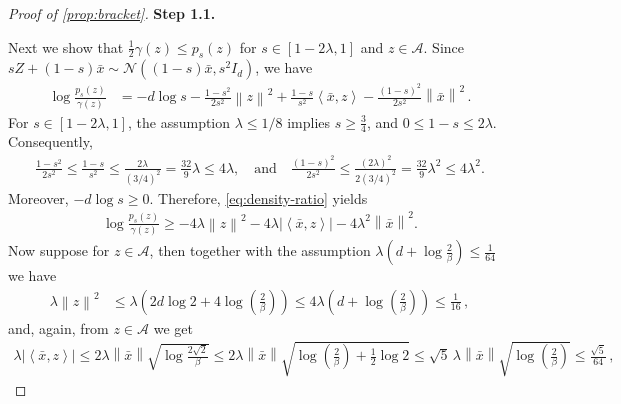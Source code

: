 \documentclass{article}
\newcommand{\proofstepinline}[1]{%
    {\normalfont\normalsize\bfseries\color{blue!55!black}Step #1.}\enspace
}
\newcommand{\N}{\mathcal N}
\newcommand{\1}{\mathbf 1}
\newcommand{\ip}[2]{\left\langle #1,#2\right\rangle}
\newcommand{\norm}[1]{\left\lVert #1\right\rVert}
\begin{document}
\begin{proof}[Proof of \cref{prop:bracket}]
    \proofstepinline{1.1}
    Next we show that $\frac12\gamma(z)\leq p_s(z)$ for $s\in[1-2\lambda,1]$ and $z\in\mathcal A$.
    Since $sZ+(1-s)\bar{x}\sim\N((1-s)\bar{x},s^2I_d)$,
    we have
    \begin{align}
        \log\frac{p_s(z)}{\gamma(z)}
         & =-d\log s
        -\frac{1-s^2}{2s^2}\norm{z}^2
        +\frac{1-s}{s^2}\ip{\bar{x}}{z}
        -\frac{(1-s)^2}{2s^2}\norm{\bar{x}}^2\,.
        \label{eq:density-ratio}
    \end{align}
    For $s\in[1-2\lambda,1]$, the assumption $\lambda\leq1/8$ implies $s\geq\frac34$, and $0\leq1-s\leq2\lambda$.
    Consequently,
    \begin{align}
        \frac{1-s^2}{2s^2}
        \leq
        \frac{1-s}{s^2}
        \leq
        \frac{2\lambda}{(3/4)^2}
        =
        \frac{32}{9}\lambda
        \leq4\lambda,
        \quad\text{and}\quad
        \frac{(1-s)^2}{2s^2}
        \leq
        \frac{(2\lambda)^2}{2(3/4)^2}
        =
        \frac{32}{9}\lambda^2
        \leq4\lambda^2.
    \end{align}
    Moreover, $-d\log s\geq0$. Therefore,
    \eqref{eq:density-ratio} yields
    \begin{align}
        \log\frac{p_s(z)}{\gamma(z)}
        \geq
        -4\lambda\norm{z}^2
        -4\lambda\left|\ip{\bar{x}}{z}\right|
        -4\lambda^2\norm{\bar{x}}^2.
        \label{eq:density-ratio-lower}
    \end{align}
    Now suppose for $z\in\mathcal A$, then
    together with the assumption $\lambda\left(d+\log\frac2\beta\right)\leq \frac{1}{64}$ we have
    \begin{align}
        \lambda\norm{z}^2
         & \leq
        \lambda\left(
        2d\log2+4\log\left(\frac2\beta\right)
        \right)
        \leq
        4\lambda\left(d+\log\left(\frac2\beta\right)\right)
        \leq
        \frac{1}{16}\,,
        \label{ineq:lambda-z-squared-bound}
    \end{align}
    and, again, from $z\in\mathcal A$ we get
    \begin{align}
        \lambda\left|\ip{\bar{x}}{z}\right|
        \leq
        2\lambda\norm{\bar{x}}
        \sqrt{\log\frac{2\sqrt2}{\beta}}
        \leq
        2\lambda\norm{\bar{x}}
        \sqrt{
            \log\left(
            \frac{2}{\beta}
            \right)
            +\frac12\log2
        }
        \leq
        \sqrt5\,
        \lambda\norm{\bar{x}}\sqrt{\log\left(\frac{2}{\beta}\right)}
        \leq
        \frac{\sqrt5}{64}\,,
    \end{align}

\end{proof}
\end{document}
